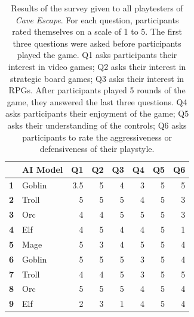 \begin{table}[htbp]
  \centering
  \caption{Results of the survey given to all playtesters of \textit{Cave Escape}. For each question, participants rated themselves on a scale of 1 to 5. The first three questions were asked before participants played the game. Q1 asks participants their interest in video games; Q2 asks their interest in strategic board games; Q3 asks their interest in RPGs. After participants played 5 rounds of the game, they answered the last three questions. Q4 asks participants their enjoyment of the game; Q5 asks their understanding of the controls; Q6 asks participants to rate the aggressiveness or defensiveness of their playstyle.}
    \begin{tabular}{|rlrrrrrr|}
    \toprule
    \rowcolor[rgb]{ 0,  0,  0} \multicolumn{1}{|l}{\textcolor[rgb]{ 1,  1,  1}{\textbf{Test \#}}} & \textcolor[rgb]{ 1,  1,  1}{\textbf{AI Model}} & \multicolumn{1}{l}{\textcolor[rgb]{ 1,  1,  1}{\textbf{Q1}}} & \multicolumn{1}{l}{\textcolor[rgb]{ 1,  1,  1}{\textbf{Q2}}} & \multicolumn{1}{l}{\textcolor[rgb]{ 1,  1,  1}{\textbf{Q3}}} & \multicolumn{1}{l}{\textcolor[rgb]{ 1,  1,  1}{\textbf{Q4}}} & \multicolumn{1}{l}{\textcolor[rgb]{ 1,  1,  1}{\textbf{Q5}}} & \multicolumn{1}{l|}{\textcolor[rgb]{ 1,  1,  1}{\textbf{Q6}}} \\
    \midrule
    \rowcolor[rgb]{ .851,  .851,  .851} \textbf{1} & Goblin & 3.5   & 5     & 4     & 3     & 5     & 5 \\
    \midrule
    \textbf{2} & Troll & 5     & 5     & 5     & 4     & 5     & 3 \\
    \midrule
    \rowcolor[rgb]{ .851,  .851,  .851} \textbf{3} & Orc   & 4     & 4     & 5     & 5     & 5     & 3 \\
    \midrule
    \textbf{4} & Elf   & 4     & 5     & 4     & 4     & 5     & 1 \\
    \midrule
    \rowcolor[rgb]{ .851,  .851,  .851} \textbf{5} & Mage  & 5     & 3     & 4     & 5     & 5     & 4 \\
    \midrule
    \textbf{6} & Goblin & 5     & 5     & 5     & 3     & 5     & 4 \\
    \midrule
    \rowcolor[rgb]{ .851,  .851,  .851} \textbf{7} & Troll & 4     & 4     & 5     & 3     & 5     & 5 \\
    \midrule
    \textbf{8} & Orc   & 5     & 5     & 5     & 4     & 5     & 4 \\
    \midrule
    \rowcolor[rgb]{ .851,  .851,  .851} \textbf{9} & Elf   & 2     & 3     & 1     & 4     & 5     & 4 \\

\end{tabular}
\end{table}
